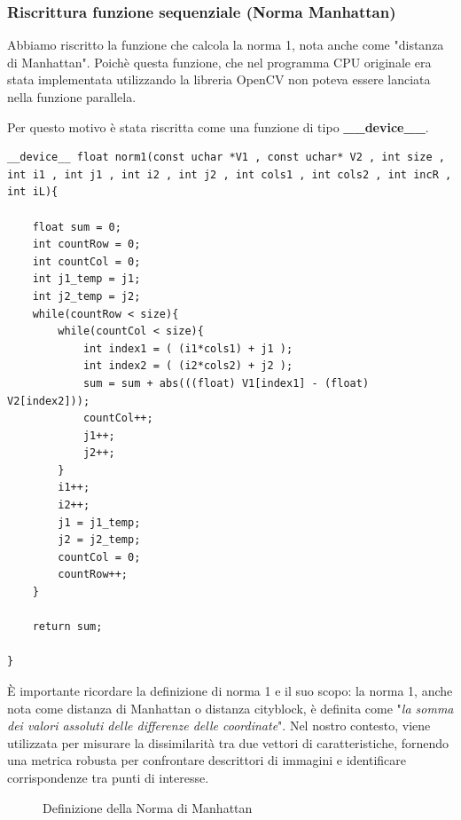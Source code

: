 \documentclass[12pt,a4paper]{report}
\begin{document}
\subsubsection{Riscrittura funzione sequenziale (Norma Manhattan)}
Abbiamo riscritto la funzione che calcola la norma 1, nota anche come "distanza di Manhattan". Poichè questa funzione, che nel programma CPU originale era stata implementata utilizzando la libreria OpenCV non poteva essere lanciata nella funzione parallela. 

Per questo motivo è stata riscritta come una funzione di tipo \textbf{\_\_device\_\_}.

\begin{lstlisting}
__device__ float norm1(const uchar *V1 , const uchar* V2 , int size , int i1 , int j1 , int i2 , int j2 , int cols1 , int cols2 , int incR , int iL){

    float sum = 0;
    int countRow = 0;
    int countCol = 0;
    int j1_temp = j1;
    int j2_temp = j2;
    while(countRow < size){
        while(countCol < size){
            int index1 = ( (i1*cols1) + j1 );
            int index2 = ( (i2*cols2) + j2 );
            sum = sum + abs(((float) V1[index1] - (float) V2[index2]));
            countCol++;
            j1++;
            j2++;
        }
        i1++;
        i2++;
        j1 = j1_temp;
        j2 = j2_temp;
        countCol = 0;
        countRow++;
    }

    return sum;
    
}
\end{lstlisting}

\vspace{1cm}

È importante ricordare la definizione di norma 1 e il suo scopo: la norma 1, anche nota come distanza di Manhattan o distanza cityblock, è definita come "\textit{la somma dei valori assoluti delle differenze delle coordinate}". Nel nostro contesto, viene utilizzata per misurare la dissimilarità tra due vettori di caratteristiche, fornendo una metrica robusta per confrontare descrittori di immagini e identificare corrispondenze tra punti di interesse.

\begin{figure}[H]
    \centering
    \caption{Definizione della Norma di Manhattan}
\end{figure}
\end{document}
